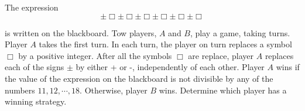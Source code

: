 The expression\[ \pm \Box \pm \Box \pm \Box \pm \Box \pm \Box \pm \Box \]

is written on the blackboard. Tow players, $ A $ and $ B $,  play a game, taking turns. Player $ A $ takes the first turn. In each turn, the player on turn replaces a symbol $ \Box $ by a positive integer. After all the symbols $\Box$ are replace, player $A$ replaces each of the signs $\pm$ by either + or -, independently of each other. Player $ A $ wins if the value of the expression on the blackboard is not divisible by any of the numbers $ 11, 12, \cdots, 18 $. Otherwise, player $ B$ wins. Determine which player has a winning strategy.